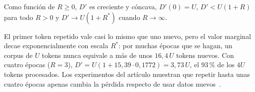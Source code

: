\begin{proposicion}\label{prop:efectivos}
Como función de $R\ge 0$, $D'$ es creciente y cóncava, $D'(0)=U$, $D'<U(1+R)$ para todo $R>0$ y $D'\to U(1+R^{*})$ cuando $R\to\infty$.
\end{proposicion}

El primer token repetido vale casi lo mismo que uno nuevo, pero el valor marginal decae exponencialmente con escala $R^{*}$: por muchas épocas que se hagan, un corpus de $U$ tokens nunca equivale a más de unos $16{,}4\,U$ tokens nuevos. Con cuatro épocas ($R=3$), $D'=U(1+15{,}39\cdot 0{,}1772)=3{,}73\,U$, el $93\,\%$ de los $4U$ tokens procesados. Los experimentos del artículo muestran que repetir hasta unas cuatro épocas apenas cambia la pérdida respecto de usar datos nuevos~\cite{muennighoff}.

